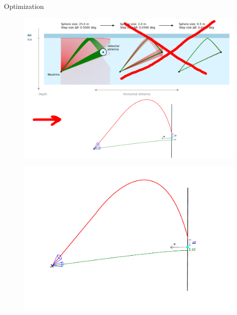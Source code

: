 \documentclass{beamer}
\begin{document}
\begin{frame}
	\centering
	Optimization
\end{frame}
\begin{frame}
	\begin{figure}
		\includegraphics[width=\textwidth]{figures/FullHybridIllu.png}
	\end{figure}
\end{frame}
\begin{frame}
	\begin{figure}
		\includegraphics[width=\textwidth]{figures/PrincipleHybridIllu.pdf}
	\end{figure}
\end{frame}
\end{document}
